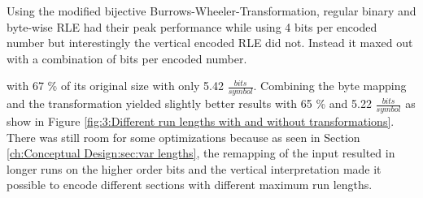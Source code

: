 \par{
Using the modified bijective Burrows-Wheeler-Transformation, regular binary and byte-wise RLE had their peak performance while using 4 bits per encoded number but interestingly the vertical encoded RLE did not. Instead it maxed out with a combination of bits per encoded number.


with 67 \% of its original size with only 5.42 $\frac{bits}{symbol}$. Combining the byte mapping and the transformation yielded slightly better results with 65 \% and 5.22 $\frac{bits}{symbol}$ as show in Figure \ref{fig:3:Different run lengths with and without transformations}. There was still room for some optimizations because as seen in Section \ref{ch:Conceptual Design:sec:var lengths}, the remapping of the input resulted in longer runs on the higher order bits and the vertical interpretation made it possible to encode different sections with different maximum run lengths.

}
